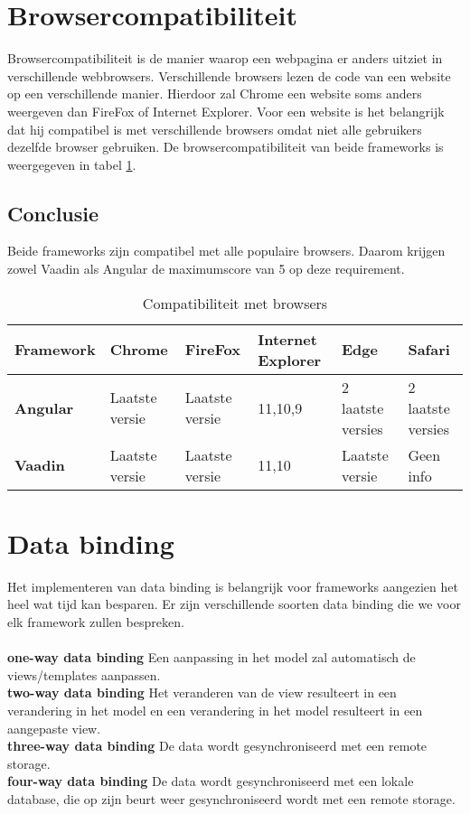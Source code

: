 \section{Browsercompatibiliteit}
Browsercompatibiliteit is de manier waarop een webpagina er anders uitziet in verschillende webbrowsers. Verschillende browsers lezen de code van een website op een verschillende manier. Hierdoor zal Chrome een website soms anders weergeven dan FireFox of Internet Explorer. Voor een website is het belangrijk dat hij compatibel is met verschillende browsers omdat niet alle gebruikers dezelfde browser gebruiken. 
De browsercompatibiliteit van beide frameworks is weergegeven in tabel  \ref{table:browsercompatibiliteit}.

\subsection{Conclusie}
Beide frameworks zijn compatibel met alle populaire browsers. Daarom krijgen zowel Vaadin als Angular de maximumscore van 5 op deze requirement.


\begin{table}[H]
	\begin{tabular}{|l|l|l|l|l|l|}
		\hline
		\textbf{Framework} & \textbf{Chrome} & \textbf{FireFox} & \textbf{Internet Explorer} & \textbf{Edge}     & \textbf{Safari}   \\ \hline
		\textbf{Angular}   & Laatste versie  & Laatste versie   & 11,10,9                    & 2 laatste versies & 2 laatste versies \\ \hline
		\textbf{Vaadin}    & Laatste versie  & Laatste versie   & 11,10                      & Laatste versie    & Geen info         \\ \hline
	\end{tabular}
\caption{Compatibiliteit met browsers}
\label{table:browsercompatibiliteit}
\end{table}


\section{Data binding}
Het implementeren van data binding is belangrijk voor frameworks aangezien het heel wat tijd kan besparen. Er zijn verschillende soorten data binding die we voor elk framework zullen bespreken.
\\  \\
\textbf{one-way data binding} \hspace{1cm} Een aanpassing in het model zal automatisch de views/templates aanpassen.
\\
\textbf{two-way data binding} \hspace{1cm} Het veranderen van de view resulteert in een verandering in het model en een verandering in het model resulteert in een aangepaste view. 
\\
\textbf{three-way data binding} \hspace{1cm} De data wordt gesynchroniseerd met een  remote storage. 
\\
\textbf{four-way data binding} \hspace{1cm} De data wordt gesynchroniseerd met een  lokale database, die op zijn beurt weer gesynchroniseerd wordt met een remote storage.

